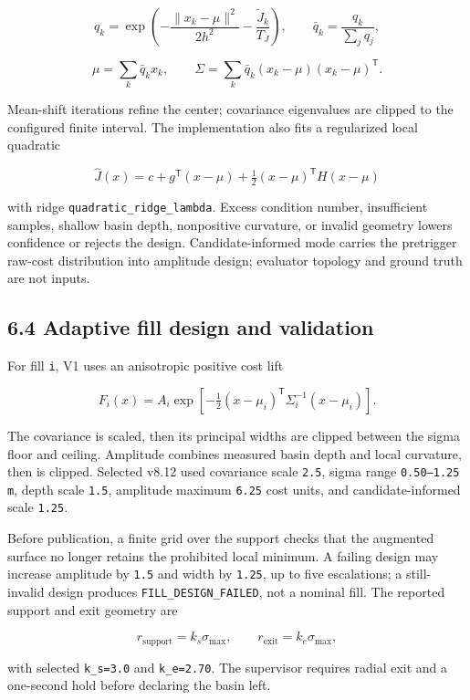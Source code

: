 \documentclass[
  10pt,
  letterpaper,
]{article}
\begin{document}
\[
q_k=\exp\!\left(-\frac{\lVert x_k-\mu\rVert^2}{2h^2}
-\frac{\widetilde J_k}{T_J}\right),\qquad
\bar q_k=\frac{q_k}{\sum_jq_j},
\]

\[
\mu=\sum_k\bar q_kx_k,\qquad
\Sigma=\sum_k\bar q_k(x_k-\mu)(x_k-\mu)^\mathsf{T}.
\]

Mean-shift iterations refine the center; covariance eigenvalues are clipped to
the configured finite interval. The implementation also fits a regularized
local quadratic

\[
\hat J(x)=c+g^\mathsf{T}(x-\mu)
+\tfrac12(x-\mu)^\mathsf{T}H(x-\mu)
\]

with ridge \nolinkurl{quadratic\_ridge\_lambda}. Excess condition number, insufficient
samples, shallow basin depth, nonpositive curvature, or invalid geometry lowers
confidence or rejects the design. Candidate-informed mode carries the
pretrigger raw-cost distribution into amplitude design; evaluator topology and
ground truth are not inputs.

\subsection{6.4 Adaptive fill design and validation}\label{adaptive-fill-design-and-validation}

For fill \nolinkurl{i}, V1 uses an anisotropic positive cost lift

\[
F_i(x)=A_i\exp\!\left[-\tfrac12
(x-\mu_i)^\mathsf{T}\Sigma_i^{-1}(x-\mu_i)\right].
\]

The covariance is scaled, then its principal widths are clipped between the
sigma floor and ceiling. Amplitude combines measured basin depth and local
curvature, then is clipped. Selected v8.12 used covariance scale \nolinkurl{2.5}, sigma
range \texttt{0.50--1.25 m}, depth scale \nolinkurl{1.5}, amplitude maximum \nolinkurl{6.25} cost units,
and candidate-informed scale \nolinkurl{1.25}.

Before publication, a finite grid over the support checks that the augmented
surface no longer retains the prohibited local minimum. A failing design may
increase amplitude by \nolinkurl{1.5} and width by \nolinkurl{1.25}, up to five escalations; a
still-invalid design produces \nolinkurl{FILL\_DESIGN\_FAILED}, not a nominal fill. The
reported support and exit geometry are

\[
r_{\mathrm{support}}=k_s\sigma_{\max},\qquad
r_{\mathrm{exit}}=k_e\sigma_{\max},
\]

with selected \nolinkurl{k\_s=3.0} and \nolinkurl{k\_e=2.70}. The supervisor requires radial exit
and a one-second hold before declaring the basin left.
\end{document}
